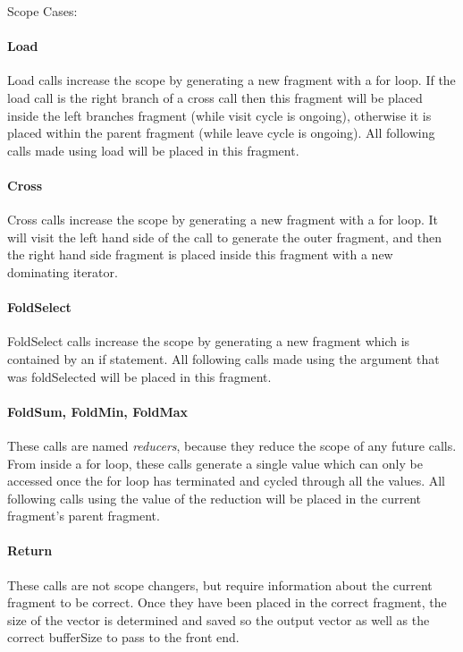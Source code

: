 Scope Cases:
\paragraph{Load}

Load calls increase the scope by generating a new fragment with a for loop. If the load call is the right branch of a cross call then this fragment will be placed inside the left branches fragment (while visit cycle is ongoing), otherwise it is placed within the parent fragment (while leave cycle is ongoing). All following calls made using load will be placed in this fragment.

\paragraph{Cross}

Cross calls increase the scope by generating a new fragment with a for loop. It will visit the left hand side of the call to generate the outer fragment, and then the right hand side fragment is placed inside this fragment with a new dominating iterator.

\paragraph{FoldSelect}

FoldSelect calls increase the scope by generating a new fragment which is contained by an if statement. All following calls made using the argument that was foldSelected will be placed in this fragment.

\paragraph{FoldSum, FoldMin, FoldMax}

These calls are named \emph{reducers}, because they reduce the scope of any future calls. From inside a for loop, these calls generate a single value which can only be accessed once the for loop has terminated and cycled through all the values. All following calls using the value of the reduction will be placed in the current fragment's parent fragment.

\paragraph{Return}

These calls are not scope changers, but require information about the current fragment to be correct. Once they have been placed in the correct fragment, the size of the vector is determined and saved so the output vector as well as the correct bufferSize to pass to the front end.

